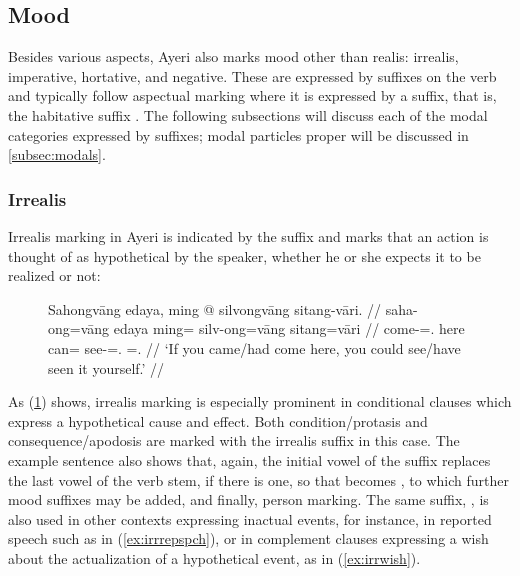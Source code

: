 
\subsection{Mood}
\label{subsec:mood}

Besides various aspects, Ayeri also marks mood other than realis: irrealis,
imperative, hortative, and negative. These are expressed by suffixes on
the verb and typically follow aspectual marking where it is expressed by a
suffix, that is, the habitative suffix . The following
subsections will discuss each of the modal categories expressed by suffixes;
modal particles proper will be discussed in \autoref{subsec:modals}.

\subsubsection{Irrealis}

Irrealis marking in Ayeri is indicated by the suffix  and 
marks that an action is thought of as hypothetical by the speaker, whether he 
or she expects it to be realized or not:

\begin{figure}[h]
\ex\label{ex:irrealis}\begingl
	\gla Sahongvāng edaya, ming @ silvongvāng sitang-vāri. //
	\glb saha-ong=vāng edaya ming= silv-ong=vāng sitang=vāri //
	\glb come-\Irr{}=\Second{}.\Aarg{} here can= see-\Irr{}=\Second{}.\Aarg{} 
		\Refl{}=\Second{}.\Ins{} //
	\glft `If you came/had come here, you could see/have seen it 
		yourself.' //
\endgl\xe
\end{figure}

As (\ref{ex:irrealis}) shows, irrealis marking is especially prominent in
conditional clauses which express a hypothetical cause and effect. Both
condition/protasis and consequence/apodosis are marked with the irrealis suffix
in this case. The example sentence also shows that, again, the initial vowel of
the suffix replaces the last vowel of the verb stem, if there is one, so that
 becomes , to which further mood
suffixes may be added, and finally, person marking. The same suffix,
, is also used in other contexts expressing inactual events,
for instance, in reported speech such as in (\ref{ex:irrrepspch}), or in
complement clauses expressing a wish about the actualization of a hypothetical
event, as in (\ref{ex:irrwish}).

